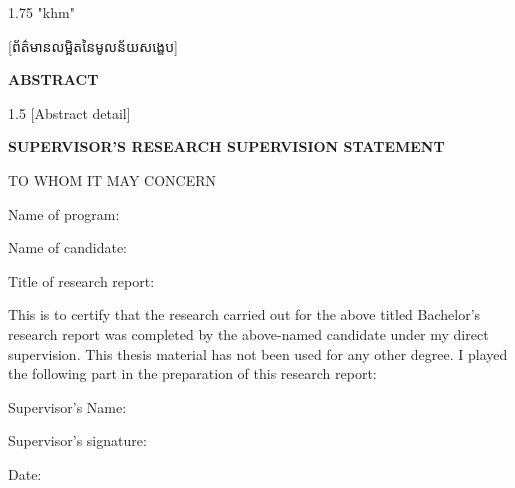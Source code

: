 \documentclass[12pt,a4paper]{report}
\newcommand{\khmerpar}[1]{%
    \par
    \khmerfont
    \justifying
    \begin{spacing}{1.75}%
        \XeTeXlinebreaklocale "khm"
        #1%
    \end{spacing}%
}
\newcommand{\khm}[1]{{\khmermuol #1}}
\begin{document}
\newpage
{}
{}
\vspace*{0\baselineskip}
\begin{center}
    \fontsize{12}{12.8}\khm{មូលន័យសង្ខេប}
\end{center}
\vspace*{1.5\baselineskip}
\begin{minipage}{\textwidth}
    \khmerpar{
        [ព័ត៌មានលម្អិតនៃមូលន័យសង្ខេប]
    }
\end{minipage}


\newpage
{}
{}
\vspace*{0\baselineskip}
\begin{center}
    \textbf{ABSTRACT}
\end{center}
\vspace*{1.5\baselineskip}
\begin{spacing}{1.5}
    [Abstract detail]
\end{spacing}

\newpage
{}
{}
\vspace*{0\baselineskip}
\begin{center}
    \textbf{SUPERVISOR'S RESEARCH SUPERVISION STATEMENT}
\end{center}
\vspace*{1.5\baselineskip}
\noindent
TO WHOM IT MAY CONCERN

\vspace*{2\baselineskip}

\noindent
\begin{minipage}{\textwidth}
    \noindent
    Name of program: {\dotfill} \par
    \noindent
    Name of candidate: {\dotfill} \par
    \vspace*{2\baselineskip}
    Title of research report:{\dotfill} \par
    \vspace*{2\baselineskip}
    This is to certify that the research carried out for the above titled Bachelor's research report was completed by the above-named candidate under my direct supervision. This thesis material has not been used for any other degree. I played the following part in the preparation of this research report:{\dotfill} \par
    \vspace*{2\baselineskip}
    Supervisor's Name: {\dotfill} \par
    \vspace*{1\baselineskip}
    Supervisor's signature: {\dotfill} \par
    \vspace*{1\baselineskip}
    Date: {\dotfill} \par
\end{minipage}
\end{document}
